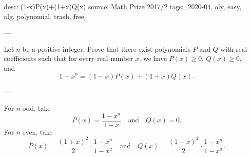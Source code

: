 desc: (1-x)P(x)+(1+x)Q(x)
source: Math Prize 2017/2
tags: [2020-04, oly, easy, alg, polynomial, trash, free]

---

Let $n$ be a positive integer. Prove that there exist polynomials $P$ and $Q$ with real coefficients such that for every real number $x$, we have $P(x)\ge0$, $Q(x)\ge0$, and \[1-x^n=(1-x)P(x)+(1+x)Q(x).\]

---

For $n$ odd, take \[P(x)=\frac{1-x^n}{1-x}\quad\text{and}\quad Q(x)=0.\]
For $n$ even, take \[P(x)=\frac{(1+x)^2}2\cdot\frac{1-x^n}{1-x^2}\quad\text{and}\quad Q(x)=\frac{(1-x)^2}2\cdot\frac{1-x^n}{1-x^2}.\]
